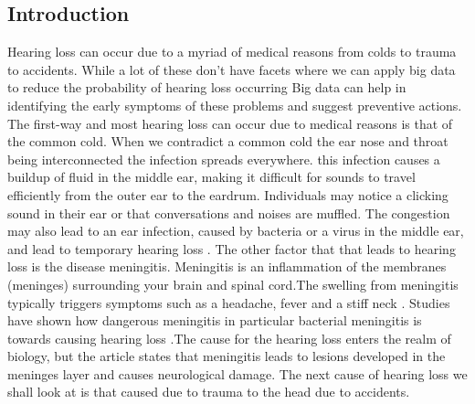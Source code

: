 \documentclass[sigconf]{acmart}
\begin{document}
\subsection{Introduction}
Hearing loss can occur due to a myriad of medical reasons from colds to trauma to accidents. While a lot of these don't have facets where we can apply big data to reduce the probability of hearing loss occurring Big data can help in identifying the early symptoms of these problems and suggest preventive actions. The first-way and most hearing loss can occur due to medical reasons is that of the common cold. When we contradict a common cold the ear nose and throat being interconnected the infection spreads everywhere. this infection causes a buildup of fluid in the middle ear, making it difficult for sounds to travel efficiently from the outer ear to the eardrum. Individuals may notice a clicking sound in their ear or that conversations and noises are muffled. The congestion may also lead to an ear infection, caused by bacteria or a virus in the middle ear, and lead to temporary hearing loss \cite{Wikipedia2017}. The other factor that that leads to hearing loss is the disease meningitis. Meningitis is an inflammation of the membranes (meninges) surrounding your brain and spinal cord.The swelling from meningitis typically triggers symptoms such as a headache, fever and a stiff neck \cite{mayoclinic2017}. Studies have shown how dangerous meningitis in particular bacterial meningitis is towards causing hearing loss \cite{mayoclinic2017}.The cause for the hearing loss enters the realm of biology, but the article \cite{Richardson1997} states that meningitis leads to lesions developed in the meninges layer and causes neurological damage. The next cause of hearing loss we shall look at is that caused due to trauma to the head due to accidents.
\end{document}
